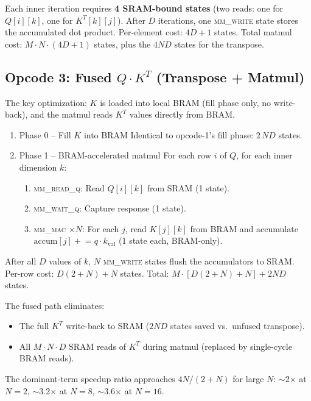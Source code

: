 \documentclass[11pt]{article}
\begin{document}
Each inner iteration requires \textbf{4 SRAM-bound states} (two reads: one for
$Q[i][k]$, one for $K^T[k][j]$). After $D$ iterations, one \textsc{mm\_write}
state stores the accumulated dot product. Per-element cost:
$4D + 1$ states. Total matmul cost: $M \cdot N \cdot (4D + 1)$ states, plus
the $4ND$ states for the transpose.


\subsection{Opcode 3: Fused $Q\!\cdot\!K^T$ (Transpose + Matmul)}

The key optimization: $K$ is loaded into local BRAM (fill phase only, no
write-back), and the matmul reads $K^T$ values directly from BRAM.

\begin{enumerate}[nosep]
    \item{Phase 0 -- Fill $K$ into BRAM} Identical to opcode-1's fill phase:
    $2\,N\!D$ states.

    \item{Phase 1 -- BRAM-accelerated matmul} For each row $i$ of $Q$, for
    each inner dimension $k$:
    \begin{enumerate}[nosep]
      \item \textsc{mm\_read\_q}: Read $Q[i][k]$ from SRAM (1 state).
      \item \textsc{mm\_wait\_q}: Capture response (1 state).
      \item \textsc{mm\_mac} $\times N$: For each $j$, read $K[j][k]$ from BRAM
            and accumulate $\text{accum}[j] \mathrel{+}= q \cdot k_{\text{val}}$
            (1 state each, BRAM-only).
    \end{enumerate}
\end{enumerate}

After all $D$ values of $k$, $N$ \textsc{mm\_write} states flush the
accumulators to SRAM. Per-row cost: $D(2 + N) + N$ states. Total:
$M \cdot [D(2+N) + N] + 2ND$ states.

The fused path eliminates:
\begin{itemize}[nosep]
  \item The full $K^T$ write-back to SRAM ($2ND$ states saved vs.\ unfused
        transpose).
  \item All $M\!\cdot\!N\!\cdot\!D$ SRAM reads of $K^T$ during matmul
        (replaced by single-cycle BRAM reads).
\end{itemize}
The dominant-term speedup ratio approaches $4N/(2+N)$ for large $N$:
$\sim$2$\times$ at $N\!=\!2$, $\sim$3.2$\times$ at $N\!=\!8$,
$\sim$3.6$\times$ at $N\!=\!16$.
\end{document}
